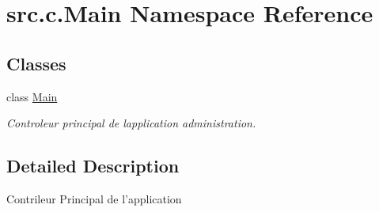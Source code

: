 \hypertarget{namespacesrc_1_1c_1_1_main}{}\section{src.\+c.\+Main Namespace Reference}
\label{namespacesrc_1_1c_1_1_main}
\subsection*{Classes}
\begin{DoxyCompactItemize}
\item 
class \hyperlink{classsrc_1_1c_1_1_main_1_1_main}{Main}
\begin{DoxyCompactList}\small\item\em Controleur principal de l\textquotesingle{}application administration. \end{DoxyCompactList}\end{DoxyCompactItemize}


\subsection{Detailed Description}
\begin{DoxyVerb}    Contrileur Principal de l'application
\end{DoxyVerb}
 